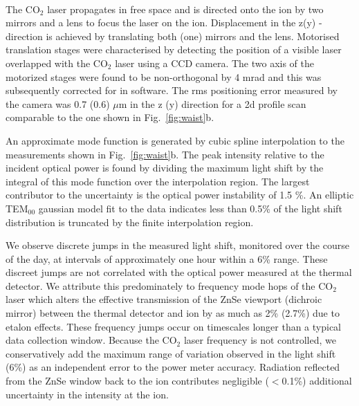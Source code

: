 \documentclass[pra,aps,showpacs,floatfix,twocolumn,nofootinbib,citeautoscript]{revtex4-1}
\newcommand{\fref}[1]{Fig.~\ref{#1}}
\begin{document}
\\

The CO$_2$ laser propagates in free space and is directed onto the ion by two mirrors and a lens to focus the laser on the ion. Displacement in the z(y) - direction is achieved by translating both (one) mirrors and the lens. Motorised translation stages were characterised by detecting the position of a visible laser overlapped with the CO$_2$ laser using a CCD camera. The two axis of the motorized stages were found to be non-orthogonal by 4 mrad and this was subsequently corrected for in software.  The rms positioning error measured by the camera was 0.7 (0.6) $\mu$m in the z (y) direction for a 2d profile scan comparable to the one shown in \fref{fig:waist}b.
  

 An approximate mode function is generated by cubic spline interpolation to the measurements shown in \fref{fig:waist}b. The peak intensity relative to the incident optical power is found by dividing the maximum light shift by the integral of this mode function over the interpolation region. The largest contributor to the uncertainty is the optical power instability of 1.5 \%.  An elliptic TEM$_{00}$ gaussian model fit to the data indicates less than 0.5\% of the light shift distribution is truncated by the finite interpolation region. 

 We observe discrete jumps in the measured light shift, monitored over the course of the day, at intervals of approximately one hour within a 6\% range. These discreet jumps are not correlated with the optical power measured at the thermal detector.  We attribute this predominately to frequency mode hops of the CO$_2$ laser which alters the effective transmission of the ZnSe viewport (dichroic mirror) between the thermal detector and ion by as much as 2\% (2.7\%) due to etalon effects.  These frequency jumps occur on timescales longer than a typical data collection window. Because the CO$_2$ laser frequency is not controlled, we conservatively add the maximum range of variation observed in the light shift (6\%) as an independent error to the power meter accuracy. Radiation reflected from the ZnSe window back to the ion contributes negligible ($<$0.1\%) additional uncertainty in the intensity at the ion.
\end{document}
